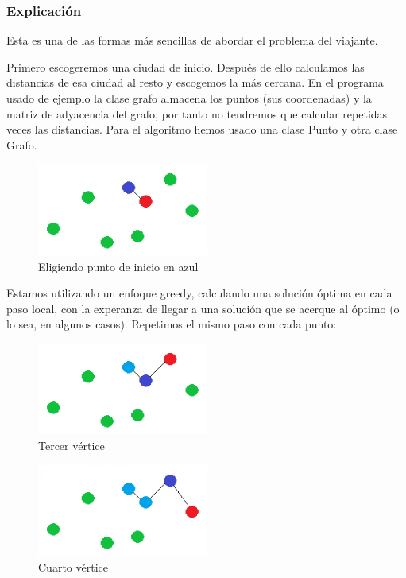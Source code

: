 \subsubsection{Explicación}
Esta es una de las formas más sencillas de abordar el problema del viajante.

Primero escogeremos una ciudad de inicio. Después de ello calculamos las distancias de esa ciudad al resto y escogemos la más cercana.
En el programa usado de ejemplo la clase grafo almacena los puntos (sus coordenadas) y la matriz de adyacencia del grafo, por tanto no 
tendremos que calcular repetidas veces las distancias. 
Para el algoritmo hemos usado una clase Punto y otra clase Grafo.

\begin{figure}[htbH] 
	\centering
	\includegraphics[width=0.5\textwidth]{./Imagenes/vecino1.png}
	\caption{Eligiendo punto de inicio en azul} 
\end{figure}

Estamos utilizando un enfoque greedy, calculando una solución óptima en cada paso local, con la experanza de llegar a una solución que se
acerque al óptimo (o lo sea, en algunos casos). Repetimos el mismo paso con cada punto:

\begin{figure}[htbH] 
	\centering
	\includegraphics[width=0.5\textwidth]{./Imagenes/vecino2.png}
	\caption{Tercer vértice} 
\end{figure}

\vspace{0.5cm}
\begin{figure}[htbH] 
	\centering
	\includegraphics[width=0.5\textwidth]{./Imagenes/vecino3.png}
	\caption{Cuarto vértice} 
\end{figure}

